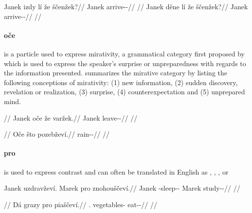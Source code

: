 \pex
\a \begingl
	\gla \ljudge{*}Janek izdy lí že ščenžek?//
	\glb Janek \Infer{} \Q{} \Pfv{} arrive-\Av{}-\Pf{}//
	\glft {}//
\endgl
\a \begingl
	\gla Janek děne lí že ščenžek?//
	\glb Janek \Spec{} \Q{} \Pfv{} arrive-\Av{}-\Pf{}//
	\glft {}//
\endgl
\xe


\paragraph{oče}  is a particle used to express
mirativity, a grammatical category first proposed by
\textcite{delancey1997mirativity} which is used to express the speaker's
surprise or unpreparedness with regards to the information presented.
\textcite{aikhenvald2012essence} summarizes the mirative category by listing the
following conceptions of mirativity: (1) new information, (2) sudden discovery,
revelation or realization, (3) surprise, (4) counterexpectation and (5)
unprepared mind.

\pex
\begingl
	\glpreamble {}//
	\gla Janek oče že varžek.//
	\glb Janek \Mir{} \Pfv{} leave-\Av{}-\Pf{}//
	\glft {}//
\endgl
\xe

\pex
\begingl
	\glpreamble {}//
	\gla Oče što pozebževí.//
	\glb \Mir{} \Aff{} rain-\Av{}-\Cont{}//
	\glft {}//
\endgl
{}%
\xe

\paragraph{pro}  is used to express contrast and can often be
translated in English as , , ,
 or 

\pex\label{ex:contrastive-part-1}
\begingl
	\gla Janek uzdravževí. Marek pro znohouščeví.//
	\glb Janek \Refl{}-sleep-\Av{}-\Cont{} Marek \Cntr{} study-\Av{}-\Cont{}//
	\glft {}//
\endgl
\xe

\pex\label{ex:contrastive-part-2}
\begingl
	\glpreamble {}//
	\gla Dá grazy pro piaščeví.//
	\glb \First.\Sg{} vegetables-\Gen{} \Cntr{} eat-\Av{}-\Cont{}//
	\glft {}//
\endgl
\xe

